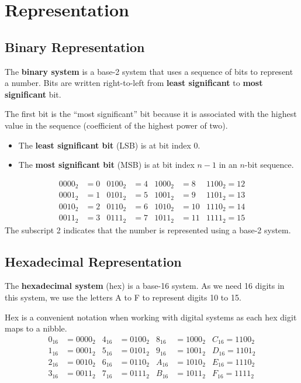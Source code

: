 \documentclass{report}
\begin{document}
\section{Representation}
\subsection{Binary Representation}
The \textbf{binary system} is a base-2 system that uses a sequence of
bits to represent a number. Bits are written right-to-left from
\textbf{least significant} to \textbf{most significant} bit.

The first bit is the ``most significant'' bit because it is associated
with the highest value in the sequence (coefficient of the highest
power of two).
\begin{itemize}
    \item The \textbf{least significant bit} (LSB) is at bit index 0.
    \item The \textbf{most significant bit} (MSB) is at bit index \(n -
          1\) in an \(n\)-bit sequence.
\end{itemize}
\begin{align*}
    0000_2 & = 0 & 0100_2 & = 4 & 1000_2 & = 8  & 1100_2 = 12 \\
    0001_2 & = 1 & 0101_2 & = 5 & 1001_2 & = 9  & 1101_2 = 13 \\
    0010_2 & = 2 & 0110_2 & = 6 & 1010_2 & = 10 & 1110_2 = 14 \\
    0011_2 & = 3 & 0111_2 & = 7 & 1011_2 & = 11 & 1111_2 = 15
\end{align*}
The subscript 2 indicates that the number is represented using a base-2 system.
\subsection{Hexadecimal Representation}
The \textbf{hexadecimal system} (hex) is a base-16 system. As we need
16 digits in this system, we use the letters A to F to represent digits
10 to 15.

Hex is a convenient notation when working with digital systems as each
hex digit maps to a nibble.
\begin{align*}
    0_{16} & = 0000_2 & 4_{16} & = 0100_2 & 8_{16} & = 1000_2 & C_{16} = 1100_2 \\
    1_{16} & = 0001_2 & 5_{16} & = 0101_2 & 9_{16} & = 1001_2 & D_{16} = 1101_2 \\
    2_{16} & = 0010_2 & 6_{16} & = 0110_2 & A_{16} & = 1010_2 & E_{16} = 1110_2 \\
    3_{16} & = 0011_2 & 7_{16} & = 0111_2 & B_{16} & = 1011_2 & F_{16} = 1111_2
\end{align*}
\end{document}
